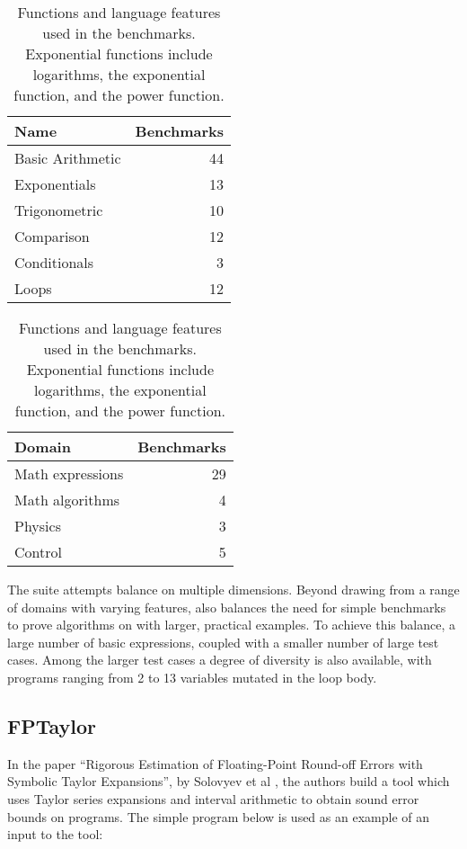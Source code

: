 \documentclass[main.tex]{subfiles}
\begin{document}
\begin{table}[hbtp]
  \begin{minipage}[t]{.45\textwidth}
    \begin{tabular}{lr}
      Name & Benchmarks \\\hline
      Basic Arithmetic & 44 \\
      Exponentials & 13 \\
      Trigonometric & 10 \\
      Comparison & 12 \\
      Conditionals & 3 \\
      Loops & 12
    \end{tabular}
    \caption{Domains from which the \name benchmarks are taken. The
      mathematical expressions are the smallest, and are largely
      drawn from \textit{Numerical Methods for Scientists and
        Engineers}~\cite{hamming-1987}.}
    \label{tbl:domains}
  \end{minipage}
  \hfill
  \begin{minipage}[t]{.45\textwidth}
    \begin{tabular}{lr}
      Domain & Benchmarks \\\hline
      Math expressions & 29 \\
      Math algorithms & 4 \\
      Physics & 3 \\
      Control & 5
    \end{tabular}
    \caption{Functions and language features used in the \name
      benchmarks. Exponential functions include logarithms, the
      exponential function, and the power function.}
    \label{tbl:features}
  \end{minipage}
\end{table}

The \name suite attempts balance on multiple dimensions.
Beyond drawing from a range of domains with varying features,
  \name also balances the need for simple benchmarks
  to prove algorithms on
  with larger, practical examples.
To achieve this balance,
  a large number of basic expressions,
  coupled with a smaller number of large test cases.
Among the larger test cases a degree of diversity is also available,
  with programs ranging
  from 2 to 13 variables mutated in the loop body.

\subsection{FPTaylor}
In the paper ``Rigorous Estimation of Floating-Point Round-off Errors
with Symbolic Taylor Expansions'', by Solovyev et al
\cite{fptaylor-fm15}, the authors build a tool which uses Taylor
series expansions and interval arithmetic to obtain sound error bounds
on programs. The simple program below is used as an example of an input
to the tool:
\end{document}
